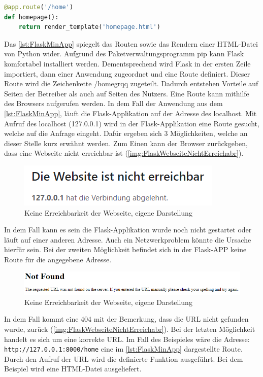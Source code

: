 \documentclass[a4paper,titlepage,halfparskip,12pt]{scrreprt}
\begin{document}
\begin{onehalfspacing}
\begin{lstlisting}[language=Python,caption=Example Listing of Flask Python,label={lst:FlaskMinApp}]
@app.route('/home')
def homepage():
	return render_template('homepage.html')
\end{lstlisting}
Das \autoref{lst:FlaskMinApp} spiegelt das Routen sowie das Rendern einer \ac{HTML}-Datei von Python wider. Aufgrund des Paketverwaltungsprogramm pip kann Flask komfortabel installiert werden. Dementsprechend wird Flask in der ersten Zeile importiert, dann einer Anwendung zugeordnet und eine Route definiert. Dieser Route wird die Zeichenkette \glqq /homegrqq{} zugeteilt. Dadurch entstehen Vorteile auf Seiten der Betreiber als auch auf Seiten des Nutzers. Eine Route kann mithilfe des Browsers aufgerufen werden. In dem Fall der Anwendung aus dem \autoref{lst:FlaskMinApp}, läuft die Flask-Applikation auf der Adresse des localhost. Mit Aufruf des localhost (127.0.0.1) wird in der Flask-Applikation eine Route gesucht, welche auf die Anfrage eingeht. Dafür ergeben sich 3 Möglichkeiten, welche an dieser Stelle kurz erwähnt werden. Zum Einen kann der Browser zurückgeben, dass eine Webseite nicht erreichbar ist (\autoref{img:FlaskWebseiteNichtErreichabr}). 
\begin{figure}[h]
	\centering
	\includegraphics[scale=1.5]{images/WebseiteNichtErreichbar}
	\caption{Keine Erreichbarkeit der Webseite, eigene Darstellung}
	\label{img:FlaskWebseiteNichtErreichabr}
\end{figure}
In dem Fall kann es sein die Flask-Applikation wurde noch nicht gestartet oder läuft auf einer anderen Adresse. Auch ein Netzwerkproblem könnte die Ursache hierfür sein. Bei der zweiten Möglichkeit befindet sich in der Flask-APP keine Route für die angegebene Adresse.
\begin{figure}[h]
	\centering
	\includegraphics[scale=1.0]{images/NotFound}
	\caption{Keine Erreichbarkeit der Webseite, eigene Darstellung}
	\label{img:FlaskWebseiteNotFound}
\end{figure}
In dem Fall kommt eine 404 mit der Bemerkung, dass die URL nicht gefunden wurde, zurück (\autoref{img:FlaskWebseiteNichtErreichabr}). Bei der letzten Möglichkeit handelt es sich um eine korrekte URL. Im Fall des Beispieles wäre die Adresse: \texttt{http://127.0.0.1:8000/home} eine im \autoref{lst:FlaskMinApp} dargestellte Route. Durch den Aufruf der URL wird die definierte Funktion ausgeführt. Bei dem Beispiel wird eine HTML-Datei ausgeliefert.

\end{onehalfspacing}
\end{document}
